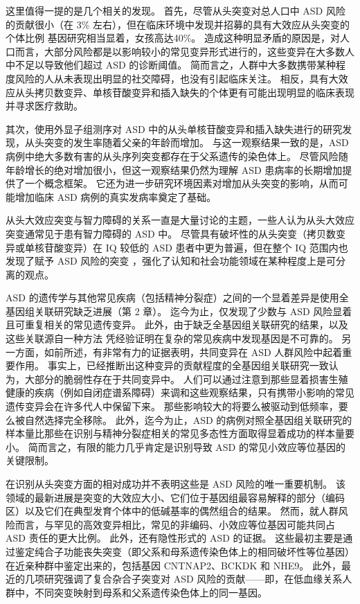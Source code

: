 这里值得一提的是几个相关的发现。 首先，尽管从头突变对总人口中 ASD 风险的贡献很小（在 3\% 左右），但在临床环境中发现并招募的具有大效应从头突变的个体比例 基因研究相当显着，女孩高达40\%。 造成这种明显矛盾的原因是，对人口而言，大部分风险都是以影响较小的常见变异形式进行的，这些变异在大多数人中不足以导致他们超过 ASD 的诊断阈值。 简而言之，人群中大多数携带某种程度风险的人从未表现出明显的社交障碍，也没有引起临床关注。 相反，具有大效应从头拷贝数变异、单核苷酸变异和插入缺失的个体更有可能出现明显的临床表现并寻求医疗救助。

其次，使用外显子组测序对 ASD 中的从头单核苷酸变异和插入缺失进行的研究发现，从头突变的发生率随着父亲的年龄而增加。 与这一观察结果一致的是，ASD 病例中绝大多数有害的从头序列突变都存在于父系遗传的染色体上。 尽管风险随年龄增长的绝对增加很小，但这一观察结果仍然为理解 ASD 患病率的长期增加提供了一个概念框架。 它还为进一步研究环境因素对增加从头突变的影响，从而可能增加临床 ASD 病例的真实发病率奠定了基础。

从头大效应突变与智力障碍的关系一直是大量讨论的主题，一些人认为从头大效应突变通常见于患有智力障碍的 ASD 中。 尽管具有破坏性的从头突变（拷贝数变异或单核苷酸变异）在 IQ 较低的 ASD 患者中更为普遍，但在整个 IQ 范围内也发现了赋予 ASD 风险的突变 ，强化了认知和社会功能领域在某种程度上是可分离的观点。

ASD 的遗传学与其他常见疾病（包括精神分裂症）之间的一个显着差异是使用全基因组关联研究缺乏进展（第 2 章）。 迄今为止，仅发现了少数与 ASD 风险显着且可重复相关的常见遗传变异。 此外，由于缺乏全基因组关联研究的结果，以及这些关联源自一种方法 凭经验证明在复杂的常见疾病中发现基因是不可靠的。 另一方面，如前所述，有非常有力的证据表明，共同变异在 ASD 人群风险中起着重要作用。 事实上，已经推断出这种变异的贡献程度的全基因组关联研究一致认为，大部分的脆弱性存在于共同变异中。 人们可以通过注意到那些显着损害生殖健康的疾病（例如自闭症谱系障碍）来调和这些观察结果，只有携带小影响的常见遗传变异会在许多代人中保留下来。 那些影响较大的将要么被驱动到低频率，要么被自然选择完全移除。 此外，迄今为止，ASD 的病例对照全基因组关联研究的样本量比那些在识别与精神分裂症相关的常见多态性方面取得显着成功的样本量要小。 简而言之，有限的能力几乎肯定是识别导致 ASD 的常见小效应等位基因的关键限制。

在识别从头突变方面的相对成功并不表明这些是 ASD 风险的唯一重要机制。 该领域的最新进展是突变的大效应大小、它们位于基因组最容易解释的部分（编码区）以及它们在典型发育个体中的低碱基率的偶然组合的结果。 然而，就人群风险而言，与罕见的高效变异相比，常见的非编码、小效应等位基因可能共同占 ASD 责任的更大比例。 此外，还有隐性形式的 ASD 的证据。 这些最初主要是通过鉴定纯合子功能丧失突变（即父系和母系遗传染色体上的相同破坏性等位基因）在近亲种群中鉴定出来的，包括基因 CNTNAP2、BCKDK 和 NHE9。 此外，最近的几项研究强调了复合杂合子突变对 ASD 风险的贡献——即，在低血缘关系人群中，不同突变映射到母系和父系遗传染色体上的同一基因。

